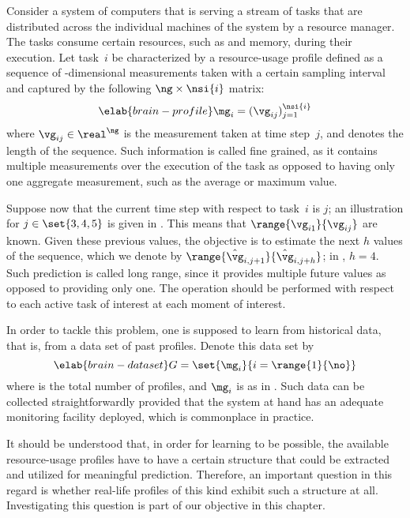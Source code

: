 Consider a system of computers that is serving a stream of tasks that are
distributed across the individual machines of the system by a resource manager.
The tasks consume certain resources, such as  and memory, during their
execution. Let task~$i$ be characterized by a resource-usage profile defined as
a sequence of \ng-dimensional measurements taken with a certain sampling
interval and captured by the following $\ng \times \nsi{i}$ matrix:
\begin{equation} \elab{brain-profile}
  \mg_i = (\vg_{ij})_{j = 1}^\nsi{i}
\end{equation}
where $\vg_{ij} \in \real^\ng$ is the measurement taken at time step~$j$, and
 denotes the length of the sequence. Such information is called fine
grained, as it contains multiple measurements over the execution of the task as
opposed to having only one aggregate measurement, such as the average or maximum
value.

Suppose now that the current time step with respect to task~$i$ is $j$; an
illustration for $j \in \set{3, 4, 5}$ is given in .
This means that $\range{\vg_{i1}}{\vg_{ij}}$ are known. Given these previous
values, the objective is to estimate the next $h$ values of the sequence, which
we denote by $\range{\hat{\vg}_{i, j + 1}}{\hat{\vg}_{i, j + h}}$; in
, $h = 4$. Such prediction is called long range, since
it provides multiple future values as opposed to providing only one. The
operation should be performed with respect to each active task of interest at
each moment of interest.

In order to tackle this problem, one is supposed to learn from historical data,
that is, from a data set of past profiles. Denote this data set by
\begin{equation} \elab{brain-dataset}
  G = \set{\mg_i}{i = \range{1}{\no}}
\end{equation}
where \no is the total number of profiles, and $\mg_i$ is as in
. Such data can be collected straightforwardly provided that
the system at hand has an adequate monitoring facility deployed, which is
commonplace in practice.

It should be understood that, in order for learning to be possible, the
available resource-usage profiles have to have a certain structure that could be
extracted and utilized for meaningful prediction. Therefore, an important
question in this regard is whether real-life profiles of this kind exhibit such
a structure at all. Investigating this question is part of our objective in this
chapter.
